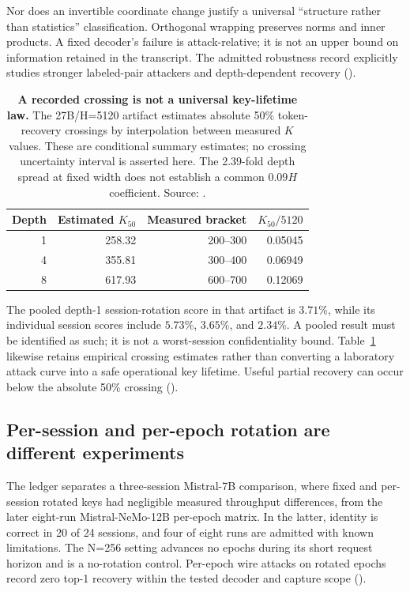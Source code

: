 Nor does an invertible coordinate change justify a universal ``structure
rather than statistics'' classification. Orthogonal wrapping preserves
norms and inner products. A fixed decoder's failure is attack-relative;
it is not an upper bound on information retained in the transcript. The
admitted robustness record explicitly studies stronger labeled-pair
attackers and depth-dependent recovery ().

\begin{table}[t]
\centering\small
\begin{tabular}{@{}rrrr@{}}
\toprule
Depth & Estimated $K_{50}$ & Measured bracket & $K_{50}/5120$ \\
\midrule
1 & 258.32 & 200--300 & 0.05045 \\
4 & 355.81 & 300--400 & 0.06949 \\
8 & 617.93 & 600--700 & 0.12069 \\
\bottomrule
\end{tabular}
\caption{\textbf{A recorded crossing is not a universal key-lifetime law.}
The 27B/H=5120 artifact estimates absolute 50\% token-recovery crossings
by interpolation between measured $K$ values. These are conditional
summary estimates; no crossing uncertainty interval is asserted here.
The 2.39-fold depth spread at fixed width does not establish a common
$0.09H$ coefficient. Source: .}
\label{tab:k50}
\end{table}

The pooled depth-1 session-rotation score in that artifact is $3.71\%$,
while its individual session scores include $5.73\%$, $3.65\%$, and
$2.34\%$. A pooled result must be identified as such; it is not a
worst-session confidentiality bound. Table~\ref{tab:k50} likewise retains
empirical crossing estimates rather than converting a laboratory attack
curve into a safe operational key lifetime. Useful partial recovery can
occur below the absolute 50\% crossing ().

\subsection{Per-session and per-epoch rotation are different experiments}

The ledger separates a three-session Mistral-7B comparison, where fixed and
per-session rotated keys had negligible measured throughput differences,
from the later eight-run Mistral-NeMo-12B per-epoch matrix. In the latter,
identity is correct in 20 of 24 sessions, and four of eight runs are
admitted with known limitations. The N=256 setting advances no epochs
during its short request horizon and is a no-rotation control. Per-epoch
wire attacks on rotated epochs record zero top-1 recovery within the tested
decoder and capture scope ().

